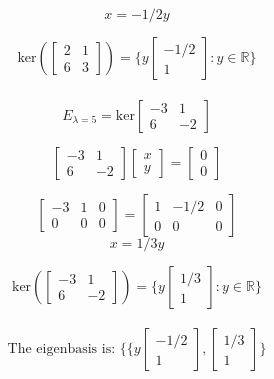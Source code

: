 \documentclass[hidelinks]{article}
\begin{document}
\[
x = -1/2y
\]

\[
	\text{ker}(\begin{bmatrix} 2 & 1 \\ 6 & 3 \end{bmatrix}) = \{ y \begin{bmatrix} -1/2 \\ 1 \end{bmatrix}: y \in \mathbb{R}\}
\]
\\
\[
E_{\lambda = 5} = \text{ker}\begin{bmatrix} -3 & 1 \\ 6 & -2 \end{bmatrix} 
\]

\[
\begin{bmatrix} -3 & 1 \\ 6 & -2 \end{bmatrix} \begin{bmatrix} x \\ y \end{bmatrix} = \begin{bmatrix} 0 \\ 0 \end{bmatrix}
\]

\[
\begin{bmatrix}-3 & 1 & 0\\ 0 & 0 & 0\end{bmatrix}= \begin{bmatrix}1 & -1/2 & 0\\ 0 & 0 & 0\end{bmatrix}
\]
\[
	x = 1/3y
\]

\[
	\text{ker}(\begin{bmatrix} -3 & 1 \\ 6 & -2 \end{bmatrix}) = \{ y \begin{bmatrix} 1/3 \\ 1 \end{bmatrix}: y \in \mathbb{R}\}
\]
\\
\[
	\text{The eigenbasis is: } \{  \{ y \begin{bmatrix} -1/2 \\ 1 \end{bmatrix},  \begin{bmatrix} 1/3 \\ 1 \end{bmatrix}\}
\]

\newpage
\end{document}
